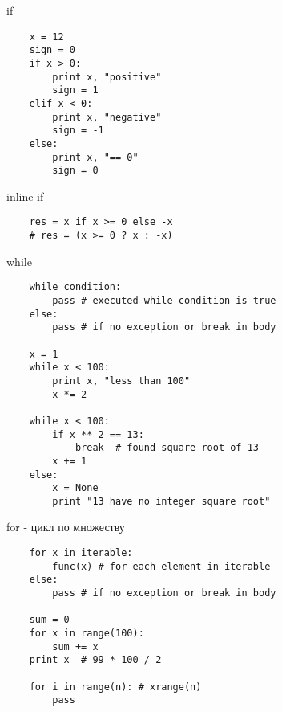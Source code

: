 \documentclass{article}
\begin{document}
\begin{center} if \end{center}
\vspace{15pt}
\begin{lstlisting}
	x = 12
	sign = 0
	if x > 0:
	    print x, "positive"
	    sign = 1
	elif x < 0:
	    print x, "negative"
	    sign = -1
	else:
	    print x, "== 0"
	    sign = 0
\end{lstlisting}
\newpage

\begin{center} inline if \end{center}
\vspace{15pt}
\begin{lstlisting}
	res = x if x >= 0 else -x
	# res = (x >= 0 ? x : -x)
\end{lstlisting}
\newpage

\begin{center} while \end{center}
\vspace{15pt}
\begin{lstlisting}
	while condition:
		pass # executed while condition is true
	else:
		pass # if no exception or break in body

	x = 1
	while x < 100:
		print x, "less than 100"
		x *= 2

	while x < 100:
		if x ** 2 == 13:
			break  # found square root of 13
		x += 1
	else:
		x = None
		print "13 have no integer square root"
\end{lstlisting}
\newpage

\begin{center} for - цикл по множеству \end{center}
\vspace{15pt}
\begin{lstlisting}
	for x in iterable:
		func(x) # for each element in iterable
	else:
		pass # if no exception or break in body

	sum = 0
	for x in range(100):
		sum += x
	print x  # 99 * 100 / 2

	for i in range(n): # xrange(n)
	    pass

\end{lstlisting}
\newpage
\end{document}
